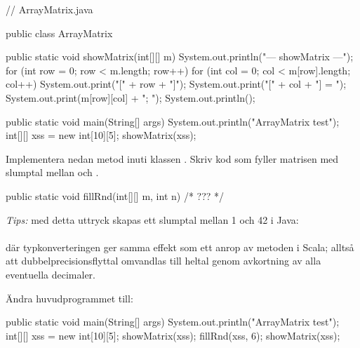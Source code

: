 \begin{Code}[language=Java]
// ArrayMatrix.java

public class ArrayMatrix {

    public static void showMatrix(int[][] m){
        System.out.println("\n--- showMatrix ---");
        for (int row = 0; row < m.length; row++){
            for (int col = 0; col < m[row].length; col++) {
                System.out.print("[" + row + "]");
                System.out.print("[" + col + "] = ");
                System.out.print(m[row][col] + "; ");
            }
            System.out.println();
        }
    }
    
    public static void main(String[] args) {
        System.out.println("ArrayMatrix test");
        int[][] xss = new int[10][5];
        showMatrix(xss);
    }
}
\end{Code}

\Subtask Implementera nedan metod  inuti klassen . Skriv kod som fyller matrisen  med slumptal mellan  och .
\begin{Code}[language=Java]
    public static void fillRnd(int[][] m, int n){
        /* ??? */
    }
\end{Code}
\noindent \emph{Tips:} med detta uttryck skapas ett slumptal mellan 1 och 42 i Java:\\
 \\
där typkonverteringen  ger samma effekt som ett anrop av metoden  i Scala; alltså att dubbelprecisionsflyttal omvandlas till heltal genom avkortning av alla eventuella decimaler.


Ändra huvudprogrammet till:
\begin{Code}[language=Java]
    public static void main(String[] args) {
        System.out.println("ArrayMatrix test");
        int[][] xss = new int[10][5];
        showMatrix(xss);
        fillRnd(xss, 6);
        showMatrix(xss);
    }
\end{Code}

